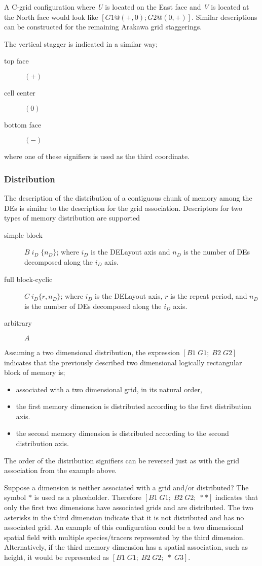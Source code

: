 A C-grid configuration where {\em U} is located on the East face and {\em V} is located at the North face would look like $[ G1 @(+,0) ; G2 @ (0,+)]$. Similar descriptions can be constructed for the remaining Arakawa grid staggerings. 

The vertical stagger is indicated in a similar way;  
\begin{description}
	\item [top face] $(+)$
	\item [cell center] $(0)$
	\item [bottom face] $(-)$
\end{description}
where one of these signifiers is used as the third coordinate.

\subsubsection{Distribution}
The description of the distribution of a contiguous chunk of memory among the DEs is similar to the description for the grid association. Descriptors for two types of memory distribution are supported
\begin{description}
	\item[simple block] $B \; i_D \; \{ n_D \} $; where $i_D$ is the DELayout axis and $n_D$ is the number of DEs decomposed along the $i_D$ axis.
	\item[full block-cyclic] $C \; i_D \{ r,n_D \} $; where $i_D$ is the DELayout axis, $r$ is the repeat period, and $n_D$ is the number of DEs decomposed along the $i_D$ axis.
	\item[arbitrary] $A$ 
\end{description}
Assuming a two dimensional distribution, the expression $[ B1 \; G1; \; B2 \; G2 ]$ indicates that the previously described two dimensional logically rectangular block of memory is;
\begin{itemize}
	\item associated with a two dimensional grid, in its natural order,
	\item the first memory dimension is distributed according to the first distribution axis.
	\item the second memory dimension is distributed according to the second distribution axis.

\end{itemize}
The order of the distribution signifiers can be reversed just as with the grid association from the example above. 

Suppose a dimension is neither associated with a grid and/or distributed? The symbol $\ast$ is used as a placeholder. Therefore $[ B1 \; G1; \; B2 \; G2; \; \ast \ast ]$ indicates that only the first two dimensions have associated grids and are distributed. The two asterisks in the third dimension indicate that it is not distributed and has no associated grid. An example of this configuration could be a two dimensional spatial field with multiple species/tracers represented by the third dimension. Alternatively, if the third memory dimension has a spatial association, such as height, it would be represented as $[ B1 \; G1; \; B2 \; G2; \; \ast \; G3 ]$.

